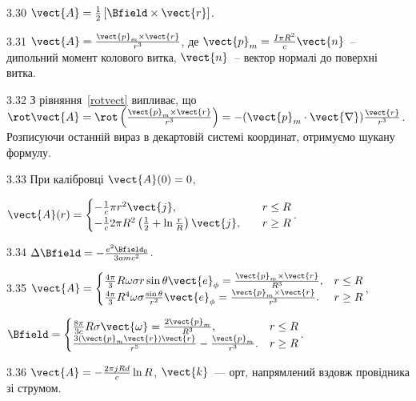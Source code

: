 \begin{Solution}{3.{30}}
	$\vect{A} = \frac12 \left[ \Bfield\times \vect{r} \right] $.
\end{Solution}
\begin{Solution}{3.{31}}
	$\vect{A} = \frac{\vect{p}_m\times\vect{r}}{r^3}$, де $\vect{p}_m = \frac{I\pi R^2}{c}\vect{n}$~-- дипольний момент колового витка, $\vect{n}$~-- вектор нормалі до поверхні витка.
\end{Solution}
\begin{Solution}{3.{32}}
	З рівняння~\eqref{rotvect} випливає, що $\rot\vect{A} = \rot\left( \frac{\vect{p}_m\times\vect{r}}{r^3}\right)  = -(\vect{p}_m\cdot\vect{\nabla}) \frac{\vect{r}}{r^3}$.
	Розписуючи останній вираз  в декартовій системі координат, отримуємо шукану формулу.
\end{Solution}
\begin{Solution}{3.{33}}
	При калібровці $\vect{A}(0) = 0$,

	$
		\vect{A}(r) = %
		\begin{cases}
			-\frac{1}{c}\pi r^2\vect{j},                                          & \quad r \le R \\
			-\frac{1}{c}2\pi R^2\left( \frac12 + \ln\frac{r}{R}\right) \vect{j} , & \quad r \ge R
		\end{cases}
	$.
\end{Solution}
\begin{Solution}{3.{34}}
	$\Delta\Bfield = -\frac{e^2 \Bfield_0}{3amc^2}$.
\end{Solution}
\begin{Solution}{3.{35}}
	$\vect{A} =
		\begin{cases}
			\frac{4\pi}{3}R\omega\sigma r\sin\theta \vect{e}_{\phi} = \frac{\vect{p}_m\times\vect{r}}{R^3},              & r \le R \\
			\frac{4\pi}{3}R^4\omega\sigma \frac{\sin\theta}{r^2} \vect{e}_{\phi} = \frac{\vect{p}_m\times\vect{r}}{r^3}. & r \ge R \\
		\end{cases}$,

	$\Bfield =
		\begin{cases}
			\frac{8\pi}{3c}R\sigma\vect{\omega} = \frac{2\vect{p}_m}{R^3},     & r \le R \\
			\frac{3(\vect{p}_m\vect{r})\vect{r}}{r^5} -\frac{\vect{p}_m}{r^3}. & r \ge R \\
		\end{cases}$.
\end{Solution}
\begin{Solution}{3.{36}}
	$\vect{A} = - \frac{2\pi jRd}{c}\ln R$,  $\vect{k}$~--- орт, напрямлений вздовж провідника зі струмом.
\end{Solution}
